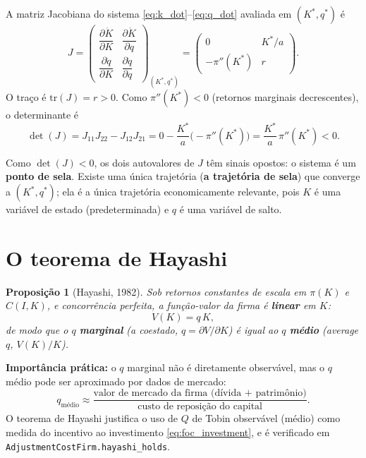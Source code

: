 \documentclass[11pt,a4paper]{article}
\newtheorem{theorem}{Proposição}
\begin{document}
A matriz Jacobiana do sistema \eqref{eq:k_dot}--\eqref{eq:q_dot} avaliada
em $(K^*,q^*)$ é
\begin{equation}\label{eq:jacobian}
  J = \begin{pmatrix}
    \dfrac{\partial \dot K}{\partial K} & \dfrac{\partial \dot K}{\partial q} \\[8pt]
    \dfrac{\partial \dot q}{\partial K} & \dfrac{\partial \dot q}{\partial q}
  \end{pmatrix}_{(K^*,q^*)}
  = \begin{pmatrix}
    0 & K^*/a \\
    -\pi''(K^*) & r
  \end{pmatrix}.
\end{equation}
O traço é $\mathrm{tr}(J) = r > 0$. Como $\pi''(K^*)<0$ (retornos
marginais decrescentes), o determinante é
\[
  \det(J) = J_{11}J_{22}-J_{12}J_{21}
  = 0 - \frac{K^*}{a}\bigl(-\pi''(K^*)\bigr)
  = \frac{K^*}{a}\,\pi''(K^*) < 0.
\]

Como $\det(J)<0$, os dois autovalores de $J$ têm sinais opostos: o
sistema é um \textbf{ponto de sela}. Existe uma única trajetória
(\textbf{a trajetória de sela}) que converge a $(K^*,q^*)$; ela é a
única trajetória economicamente relevante, pois $K$ é uma variável de
estado (predeterminada) e $q$ é uma variável de salto.

\section{O teorema de Hayashi}

\begin{theorem}[Hayashi, 1982]
Sob retornos constantes de escala em $\pi(K)$ e $C(I,K)$, e concorrência
perfeita, a função-valor da firma é \textbf{linear} em $K$:
\[
  V(K) = q\,K,
\]
de modo que o $q$ \textbf{marginal} (a coestado, $q=\partial V/\partial K$)
é igual ao $q$ \textbf{médio} (\emph{average $q$}, $V(K)/K$).
\end{theorem}

\textbf{Importância prática:} o $q$ marginal não é diretamente
observável, mas o $q$ médio pode ser aproximado por dados de mercado:
\[
  q_{\text{médio}} \approx
  \frac{\text{valor de mercado da firma (dívida + patrimônio)}}{\text{custo de reposição do capital}}.
\]
O teorema de Hayashi justifica o uso de $Q$ de Tobin observável (médio)
como medida do incentivo ao investimento \eqref{eq:foc_investment}, e é
verificado em \texttt{AdjustmentCostFirm.hayashi\_holds}.
\end{document}
